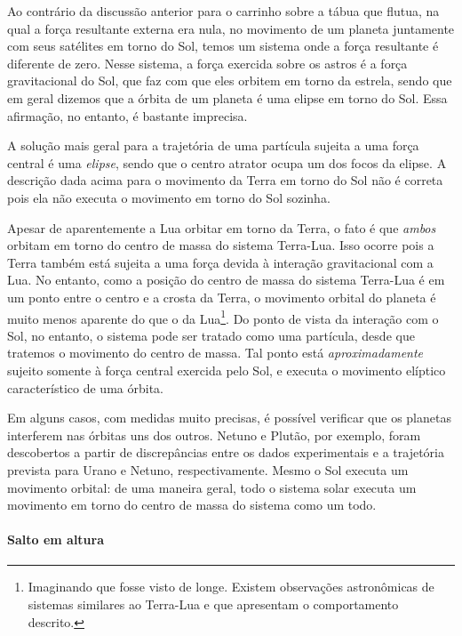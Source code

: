Ao contrário da discussão anterior para o carrinho sobre a tábua que flutua, na qual a força resultante externa era nula, no movimento de um planeta juntamente com seus satélites em torno do Sol, temos um sistema onde a força resultante é diferente de zero. Nesse sistema, a força exercida sobre os astros é a força gravitacional do Sol, que faz com que eles orbitem em torno da estrela, sendo que em geral dizemos que a órbita de um planeta é uma elipse em torno do Sol. Essa afirmação, no entanto, é bastante imprecisa.

A solução mais geral para a trajetória de uma partícula sujeita a uma força central é uma \emph{elipse}, sendo que o centro atrator ocupa um dos focos da elipse. A descrição dada acima para o movimento da Terra em torno do Sol não é correta pois ela não executa o movimento em torno do Sol sozinha.

Apesar de aparentemente a Lua orbitar em torno da Terra, o fato é que \emph{ambos} orbitam em torno do centro de massa do sistema Terra-Lua. Isso ocorre pois a Terra também está sujeita a uma força devida à interação gravitacional com a Lua. No entanto, como a posição do centro de massa do sistema Terra-Lua é em um ponto entre o centro e a crosta da Terra, o movimento orbital do planeta é muito menos aparente do que o da Lua\footnote{Imaginando que fosse visto de longe. Existem observações astronômicas de sistemas similares ao Terra-Lua e que apresentam o comportamento descrito.}. Do ponto de vista da interação com o Sol, no entanto, o sistema pode ser tratado como uma partícula, desde que tratemos o movimento do centro de massa. Tal ponto está \emph{aproximadamente} sujeito somente à força central exercida pelo Sol, e executa o movimento elíptico característico de uma órbita.

Em alguns casos, com medidas muito precisas, é possível verificar que os planetas interferem nas órbitas uns dos outros. Netuno e Plutão, por exemplo, foram descobertos a partir de discrepâncias entre os dados experimentais e a trajetória prevista para Urano e Netuno, respectivamente. Mesmo o Sol executa um movimento orbital: de uma maneira geral, todo o sistema solar executa um movimento em torno do centro de massa do sistema como um todo. 

\paragraph{Salto em altura}

